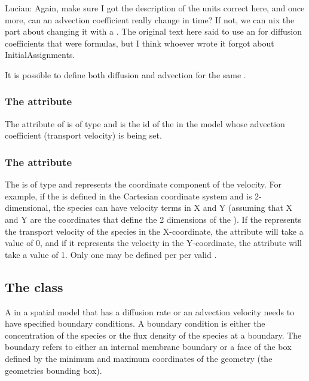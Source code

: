 {\color{red} Lucian: \notice Again, make sure I got the description of the units correct here, and once more, can an advection coefficient really change in time?  If not, we can nix the part about changing it with a \Rule.  The original text here said to use an \AssignmentRule for diffusion coefficients that were formulas, but I think whoever wrote it forgot about InitialAssignments.}

It is possible to define both diffusion and advection for the same \Species.

\subsubsection{The  attribute}
The  attribute of \AdvectionCoefficient is of type  and is the id of the \Species in the model whose advection coefficient (transport velocity) is being set.

\subsubsection{The  attribute}
The  is of type  and represents the coordinate component of the velocity. For example, if the \Geometry is defined in the Cartesian coordinate system and is 2-dimensional, the species can have velocity terms in X and Y (assuming that X and Y are the coordinates that define the 2 dimensions of the \Geometry). If the \Parameter represents the transport velocity of the species in the X-coordinate, the  attribute will take a value of 0, and if it represents the velocity in the Y-coordinate, the attribute will take a value of 1.  Only one \AdvectionCoefficient may be defined per \Species per valid .


\subsection{The  class}
\label{BoundaryCondition-class}
A \Species in a spatial model that has a diffusion rate or an advection velocity needs to have specified boundary conditions. A boundary condition is either the concentration of the species or the flux density of the species at a boundary.  The boundary refers to either an internal membrane boundary or a face of the box defined by the minimum and maximum coordinates of the geometry (the geometries bounding box).  

